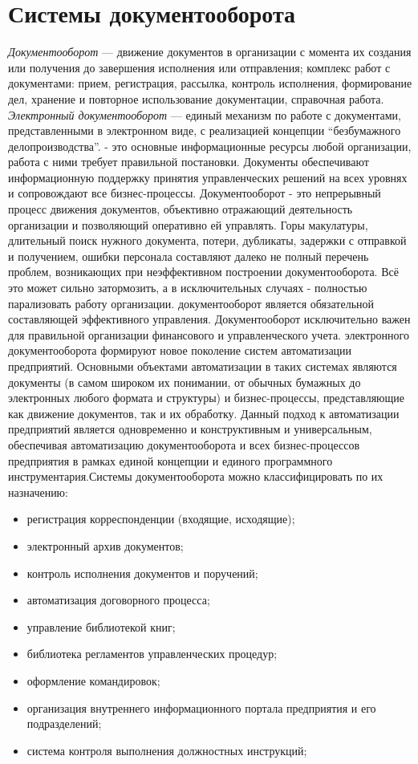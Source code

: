 \documentclass[14pt,a4paper]{reportmod}
\begin{document}
\section{Системы документооборота}
\textit{Документооборот} — движение документов в организации с момента их создания или получения до завершения исполнения или отправления; комплекс работ с документами: прием, регистрация, рассылка, контроль исполнения, формирование дел, хранение и повторное использование документации, справочная работа.
\textit{Электронный документооборот}  — единый механизм по работе с документами, представленными в электронном виде, с реализацией концепции ``безбумажного делопроизводства''.\cite{refwikidoc}
 - это основные информационные ресурсы любой организации, работа с ними требует правильной постановки. Документы обеспечивают информационную поддержку принятия управленческих решений на всех уровнях и сопровождают все бизнес-процессы. Документооборот - это непрерывный процесс движения документов, объективно отражающий деятельность организации и позволяющий оперативно ей управлять. Горы макулатуры, длительный поиск нужного документа, потери, дубликаты, задержки с отправкой и получением, ошибки персонала составляют далеко не полный перечень проблем, возникающих при неэффективном построении документооборота. Всё это может сильно затормозить, а в исключительных случаях - полностью парализовать работу организации.\cite{refdoconline}
 документооборот является обязательной составляющей эффективного управления. Документооборот исключительно важен для правильной организации финансового и управленческого учета.
 электронного документооборота формируют новое поколение систем автоматизации предприятий. Основными объектами автоматизации в таких системах являются документы (в самом широком их понимании, от обычных бумажных до электронных любого формата и структуры) и бизнес-процессы, представляющие как движение документов, так и их обработку. Данный подход к автоматизации предприятий является одновременно и конструктивным и универсальным, обеспечивая автоматизацию документооборота и всех бизнес-процессов предприятия в рамках единой концепции и единого программного инструментария.Системы документооборота можно классифицировать по их назначению:
\begin{itemize}
  \item регистрация корреспонденции (входящие, исходящие);
  \item электронный архив документов;
  \item контроль исполнения документов и поручений;
  \item автоматизация договорного процесса;
  \item управление библиотекой книг;
  \item библиотека регламентов управленческих процедур;
  \item оформление командировок;
  \item организация внутреннего информационного портала предприятия и его подразделений;
  \item система контроля выполнения должностных инструкций;
\end{itemize}
\end{document}
